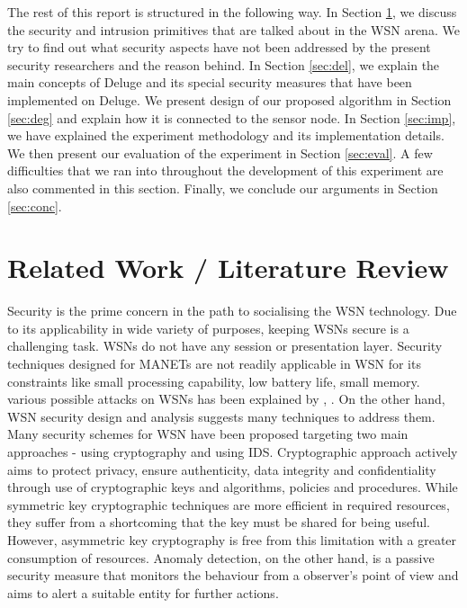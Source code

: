\documentclass[conference,man]{IEEEtran}
\begin{document}
%
The rest of this report is structured in the following way. In Section \ref{sec:lit}, we discuss the security and intrusion primitives that are talked about in the WSN arena. 
We try to find out what security aspects have not been addressed by the present  security researchers and the reason behind.
In Section \ref{sec:del}, we explain the main concepts of Deluge and its special security measures that have been implemented on Deluge. 
We present design of our proposed algorithm  in Section \ref{sec:deg} and explain how it is connected to the sensor node. 
In Section \ref{sec:imp}, we have explained the experiment methodology and its implementation details.
We then present our evaluation of the experiment in Section \ref{sec:eval}. A few difficulties that we ran into throughout
the development of this experiment are also commented in this section. 
Finally, we conclude our arguments in Section \ref{sec:conc}.
%
%
\section{Related Work / Literature Review} 
\label{sec:lit}
Security is the prime concern in the path to socialising the WSN technology.
Due to its applicability in wide variety of purposes, keeping WSNs secure is a challenging task.
WSNs do not have any session or presentation layer.
Security techniques designed for MANETs are not readily applicable in WSN for its constraints like small processing capability, low battery life, small memory.
various possible attacks on WSNs has been explained by   \cite{roosta2006taxonomy}, \cite{roosta2008attacks}.
On the other hand, WSN security design and analysis suggests many techniques to address them.
Many security schemes for WSN have been proposed targeting two main approaches - using cryptography and using IDS.%
Cryptographic approach actively aims to protect privacy, ensure authenticity, data integrity and confidentiality through use of cryptographic keys and algorithms, policies and procedures.
While symmetric key cryptographic techniques are more efficient in required resources, they suffer from a shortcoming that the key must be shared for being useful. 
However, asymmetric key cryptography is free from this limitation with a greater consumption of resources.
Anomaly detection, on the other hand, is a passive security measure that monitors the behaviour from a observer's point of view and aims to alert a suitable entity for further actions.
\end{document}
